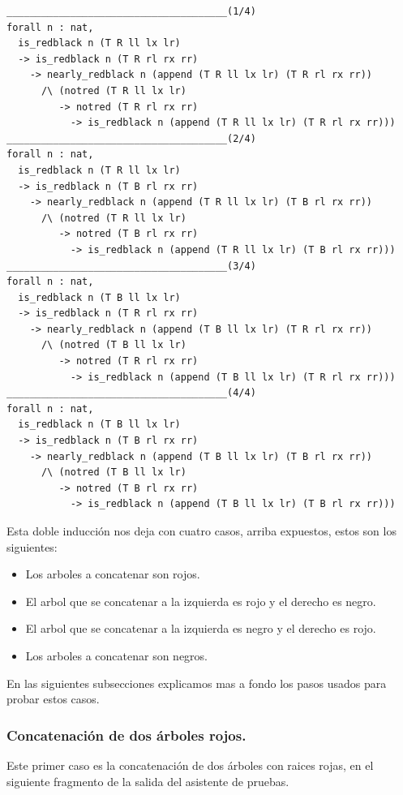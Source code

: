 \documentclass[8pt,leqno,pdflatex,spanish]{book}
\theoremstyle{plain}
\theoremstyle{definition}
\theoremstyle{remark}
\begin{document}
\begin{verbatim}
______________________________________(1/4)
forall n : nat,
  is_redblack n (T R ll lx lr)
  -> is_redblack n (T R rl rx rr)
    -> nearly_redblack n (append (T R ll lx lr) (T R rl rx rr))
      /\ (notred (T R ll lx lr)
         -> notred (T R rl rx rr)
           -> is_redblack n (append (T R ll lx lr) (T R rl rx rr)))
______________________________________(2/4)
forall n : nat,
  is_redblack n (T R ll lx lr)
  -> is_redblack n (T B rl rx rr)
    -> nearly_redblack n (append (T R ll lx lr) (T B rl rx rr))
      /\ (notred (T R ll lx lr)
         -> notred (T B rl rx rr)
           -> is_redblack n (append (T R ll lx lr) (T B rl rx rr)))
______________________________________(3/4)
forall n : nat,
  is_redblack n (T B ll lx lr)
  -> is_redblack n (T R rl rx rr)
    -> nearly_redblack n (append (T B ll lx lr) (T R rl rx rr))
      /\ (notred (T B ll lx lr)
         -> notred (T R rl rx rr)
           -> is_redblack n (append (T B ll lx lr) (T R rl rx rr)))
______________________________________(4/4)
forall n : nat,
  is_redblack n (T B ll lx lr)
  -> is_redblack n (T B rl rx rr)
    -> nearly_redblack n (append (T B ll lx lr) (T B rl rx rr))
      /\ (notred (T B ll lx lr)
         -> notred (T B rl rx rr)
           -> is_redblack n (append (T B ll lx lr) (T B rl rx rr)))
\end{verbatim}

Esta doble inducci\'on nos deja con cuatro casos, arriba expuestos, estos son los siguientes:
\begin{itemize}
    \item Los arboles a concatenar son rojos.
    \item El arbol que se concatenar a la izquierda es rojo y el derecho es negro.
    \item El arbol que se concatenar a la izquierda es negro y el derecho es rojo.
    \item Los arboles a concatenar son negros.
\end{itemize}

En las siguientes subsecciones explicamos mas a fondo los pasos usados para probar estos casos.


\subsubsection{Concatenaci\'on de dos \'arboles rojos.} 

Este primer caso es la concatenaci\'on de dos \'arboles con raices rojas, en el siguiente 
fragmento de la salida del asistente de pruebas.
\end{document}
